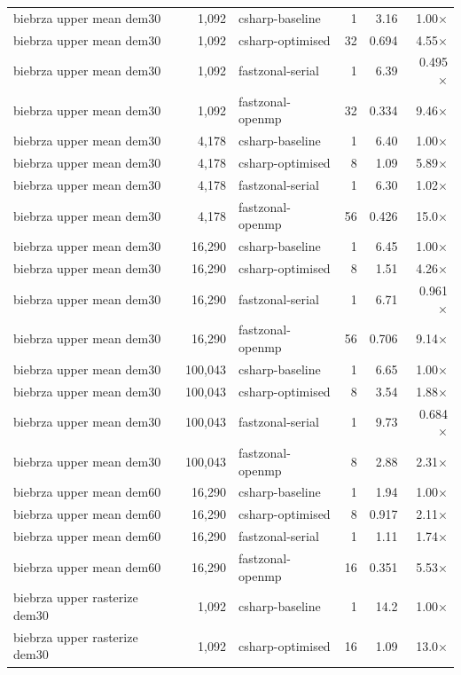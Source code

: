 \begin{tabular}{lrlrrr}
biebrza upper mean dem30 & 1,092 & csharp-baseline & 1 & 3.16 & 1.00$\times$ \\
biebrza upper mean dem30 & 1,092 & csharp-optimised & 32 & 0.694 & 4.55$\times$ \\
biebrza upper mean dem30 & 1,092 & fastzonal-serial & 1 & 6.39 & 0.495$\times$ \\
biebrza upper mean dem30 & 1,092 & fastzonal-openmp & 32 & 0.334 & 9.46$\times$ \\
biebrza upper mean dem30 & 4,178 & csharp-baseline & 1 & 6.40 & 1.00$\times$ \\
biebrza upper mean dem30 & 4,178 & csharp-optimised & 8 & 1.09 & 5.89$\times$ \\
biebrza upper mean dem30 & 4,178 & fastzonal-serial & 1 & 6.30 & 1.02$\times$ \\
biebrza upper mean dem30 & 4,178 & fastzonal-openmp & 56 & 0.426 & 15.0$\times$ \\
biebrza upper mean dem30 & 16,290 & csharp-baseline & 1 & 6.45 & 1.00$\times$ \\
biebrza upper mean dem30 & 16,290 & csharp-optimised & 8 & 1.51 & 4.26$\times$ \\
biebrza upper mean dem30 & 16,290 & fastzonal-serial & 1 & 6.71 & 0.961$\times$ \\
biebrza upper mean dem30 & 16,290 & fastzonal-openmp & 56 & 0.706 & 9.14$\times$ \\
biebrza upper mean dem30 & 100,043 & csharp-baseline & 1 & 6.65 & 1.00$\times$ \\
biebrza upper mean dem30 & 100,043 & csharp-optimised & 8 & 3.54 & 1.88$\times$ \\
biebrza upper mean dem30 & 100,043 & fastzonal-serial & 1 & 9.73 & 0.684$\times$ \\
biebrza upper mean dem30 & 100,043 & fastzonal-openmp & 8 & 2.88 & 2.31$\times$ \\
biebrza upper mean dem60 & 16,290 & csharp-baseline & 1 & 1.94 & 1.00$\times$ \\
biebrza upper mean dem60 & 16,290 & csharp-optimised & 8 & 0.917 & 2.11$\times$ \\
biebrza upper mean dem60 & 16,290 & fastzonal-serial & 1 & 1.11 & 1.74$\times$ \\
biebrza upper mean dem60 & 16,290 & fastzonal-openmp & 16 & 0.351 & 5.53$\times$ \\
biebrza upper rasterize dem30 & 1,092 & csharp-baseline & 1 & 14.2 & 1.00$\times$ \\
biebrza upper rasterize dem30 & 1,092 & csharp-optimised & 16 & 1.09 & 13.0$\times$ \\

\end{tabular}
